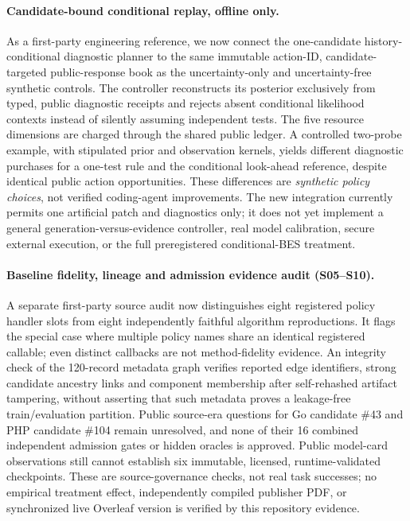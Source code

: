 \documentclass[pdflatex,sn-basic]{sn-jnl}
\begin{document}
\paragraph{Candidate-bound conditional replay, offline only.}
As a first-party engineering reference, we now connect the
one-candidate history-conditional diagnostic planner
to the same immutable action-ID, candidate-targeted
public-response book as the uncertainty-only and
uncertainty-free synthetic controls. The controller
reconstructs its posterior exclusively from typed,
public diagnostic receipts and rejects absent
conditional likelihood contexts instead of silently
assuming independent tests. The five resource
dimensions are charged through the shared public
ledger. A controlled two-probe example, with
stipulated prior and observation kernels, yields
different diagnostic purchases for a one-test rule
and the conditional look-ahead reference, despite
identical public action opportunities. These
differences are \emph{synthetic policy choices},
not verified coding-agent improvements. The new
integration currently permits one artificial patch
and diagnostics only; it does not yet implement
a general generation-versus-evidence controller,
real model calibration, secure external execution,
or the full preregistered conditional-BES treatment.

\paragraph{Baseline fidelity, lineage and admission evidence audit (S05--S10).}
A separate first-party source audit now distinguishes eight registered
policy handler slots from eight independently faithful algorithm
reproductions. It flags the special case where multiple policy names
share an identical registered callable; even distinct callbacks
are not method-fidelity evidence. An integrity check of the
120-record metadata graph verifies reported edge identifiers,
strong candidate ancestry links and component membership after
self-rehashed artifact tampering, without asserting that such
metadata proves a leakage-free train/evaluation partition.
Public source-era questions for Go candidate \#43 and PHP candidate
\#104 remain unresolved, and none of their 16 combined
independent admission gates or hidden oracles is approved.
Public model-card observations still cannot establish six
immutable, licensed, runtime-validated checkpoints.
These are source-governance checks, not real task successes;
no empirical treatment effect, independently compiled publisher
PDF, or synchronized live Overleaf version is verified by this
repository evidence.
\end{document}
